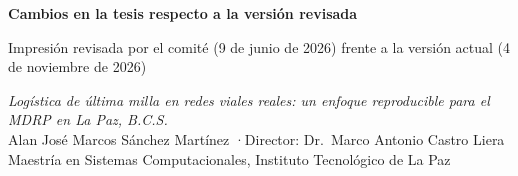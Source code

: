 \documentclass[11pt,letterpaper]{article}
\begin{document}
{\sffamily
{\LARGE\bfseries Cambios en la tesis respecto a la versión revisada}\par\vspace{4pt}
{\large Impresión revisada por el comité (9 de junio de 2026) frente a la versión actual (4 de noviembre de 2026)}\par\vspace{8pt}
\small
\textit{Logística de última milla en redes viales reales: un enfoque reproducible para el MDRP en La Paz, B.C.S.}\\
Alan José Marcos Sánchez Martínez \quad·\quad Director: Dr.\ Marco Antonio Castro Liera\\
Maestría en Sistemas Computacionales, Instituto Tecnológico de La Paz\par}

\vspace{6pt}
\end{document}
